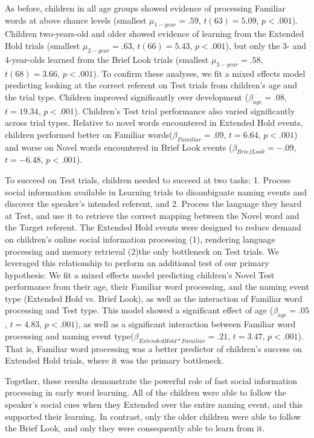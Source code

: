 \documentclass{pnastwo}
\begin{document}
\begin{article}
As before, children in all age groups showed evidence of processing Familiar words at above chance levels (smallest $\mu_{1-year} = .59$, $t(63) = 5.09$, $p < .001$). Children two-years-old and older showed evidence of learning from the Extended Hold trials (smallest $\mu_{2-year} = .63$, $t(66) = 5.43$, $p < .001$), but only the 3- and 4-year-olds learned from the Brief Look trials (smallest $\mu_{3-year} = .58$, $t(68) = 3.66$, $p < .001$). To confirm these analyses, we fit a mixed effects model predicting looking at the correct referent on Test trials from children's age and the trial type. Children improved significantly over development ($\beta_{age} = .08$, $t = 19.34$, $p < . 001$). Children's Test trial performance also varied significantly across trial types. Relative to novel words encountered in Extended Hold events, children performed better on Familiar words($\beta_{Familiar} = .09$, $t = 6.64$, $p < . 001$) and worse on Novel words encountered in Brief Look events ($\beta_{Brief Look} = -.09$, $t = -6.48$, $p < . 001$).

To succeed on Test trials, children needed to succeed at two tasks: 1. Process social information available in Learning trials to disambiguate naming events and discover the speaker's intended referent, and 2. Process the language they heard at Test, and use it to retrieve the correct mapping between the Novel word and the Target referent. The Extended Hold events were designed to reduce demand on children's online social information processing (1), rendering language processing and memory retrieval (2)the only bottleneck on Test trials. We leveraged this relationship to perform an additional test of our primary hypothesis: We fit a mixed effects model predicting children's Novel Test performance from their age, their Familiar word processing, and the naming event type (Extended Hold vs. Brief Look), as well as the interaction of Familiar word processing and Test type. This model showed a significant effect of age ($\beta_{age} = .05$, $t = 4.83$, $p < . 001$), as well as a significant interaction between Familiar word processing and naming event type($\beta_{Extended Hold * Familiar} = .21$, $t = 3.47$, $p < . 001$). That is, Familiar word processing was a better predictor of children's success on Extended Hold trials, where it was the primary bottleneck.

Together, these results demonstrate the powerful role of fast social information processing in early word learning. All of the children were able to follow the speaker's social cues when they Extended over the entire naming event, and this supported their learning. In contrast, only the older children were able to follow the Brief Look, and only they were consequently able to learn from it.



\end{article}
\end{document}
